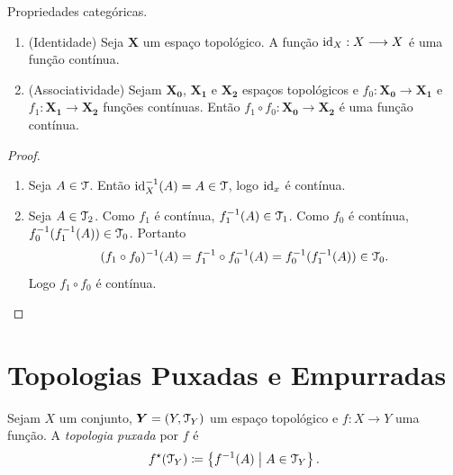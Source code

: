 \begin{prop} Propriedades categóricas.
\begin{enumerate}
	\item (Identidade) Seja $\bm X$ um espaço topológico. A função $\mathrm{id}_X: X \longrightarrow X$ é uma função contínua.
	\item (Associatividade) Sejam $\bm{X_0}$, $\bm{X_1}$ e $\bm{X_2}$ espaços topológicos e $f_0: \bm{X_0} \to \bm{X_1}$ e $f_1: \bm{X_1} \to \bm{X_2}$ funções contínuas. Então $f_1 \circ f_0: \bm{X_0} \to \bm{X_2}$ é uma função contínua.
\begin{figure}
\centering
{}
\end{figure}
	\end{enumerate}
\end{prop}
\begin{proof}
\begin{enumerate}
	\item Seja $A \in \mathcal{T}$. Então $\mathrm{id}_X^{-1}(A)=A \in \mathcal{T}$, logo $\mathrm{id}_x$ é contínua.
	
	\item Seja $A \in \mathcal{T}_2$. Como $f_1$ é contínua, $f_1^{-1}(A) \in \mathcal{T}_1$. Como $f_0$ é contínua, $f_0^{-1}(f_1^{-1}(A)) \in \mathcal{T}_0$. Portanto
	\begin{equation*}
	(f_1 \circ f_0)^{-1}(A) = f_1^{-1} \circ f_0^{-1} (A) = f_0^{-1}(f_1^{-1}(A)) \in \mathcal{T}_0.
	\end{equation*}
Logo $f_1 \circ f_0$ é contínua.
\end{enumerate}
\end{proof}

\section{Topologias Puxadas e Empurradas}

\begin{defi}
Sejam $X$ um conjunto, $\bm Y = (Y,\mathcal{T}_Y)$ um espaço topológico e $f: X \to Y$ uma função. A \emph{topologia puxada} por $f$ é
	\begin{equation*}
	f^\star(\topo_Y) \coloneqq \set{f^{-1}(A)}{A \in \topo_Y}.
	\end{equation*}
\end{defi}

